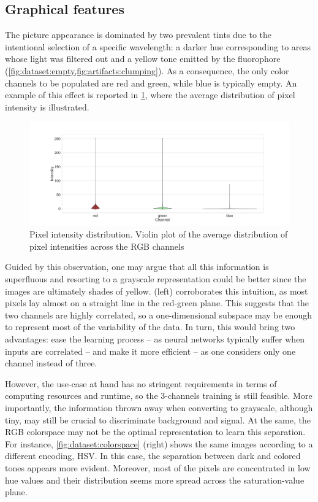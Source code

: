 \subsection{Graphical features}
The picture appearance is dominated by two prevalent tints due to the intentional selection of a specific wavelength: a darker hue corresponding to areas whose light was filtered out and a yellow tone emitted by the fluorophore
(\cref{fig:dataset:empty,fig:artifacts:clumping}).
As a consequence, the only color channels to be populated are red and green, while blue is typically empty. 
An example of this effect is reported in \cref{fig:dataset:pixel_intensity}, where the average distribution of pixel intensity is illustrated.
\begin{figure}
    \centering
    \includegraphics[width=\textwidth]{figures/120_dataset/pixel_intensity_distribution.png}
    \caption{Pixel intensity distribution. Violin plot of the average distribution of pixel intensities across the  RGB channels}
    \label{fig:dataset:pixel_intensity}
\end{figure}
Guided by this observation, one may argue that all this information is superfluous and resorting to a grayscale representation could be better since the images are ultimately shades of yellow.
 (left) corroborates this intuition, as most pixels lay almost on a straight line in the red-green plane. 
This suggests that the two channels are highly correlated, so a one-dimensional subspace may be enough to represent most of the variability of the data.
In turn, this would bring two advantages: ease the learning process -- as neural networks typically suffer when inputs are correlated %
-- and make it more efficient -- as one considers only one channel instead of three.

However, the use-case at hand has no stringent requirements in terms of computing resources and runtime, so the 3-channels training is still feasible.
More importantly, the information thrown away when converting to grayscale, although tiny, may still be crucial to discriminate background and signal. 
At the same, the RGB colorspace may not be the optimal representation to learn this separation. For instance, \cref{fig:dataset:colorspace} (right) shows the same images according to a different encoding, HSV. 
In this case, the separation between dark and colored tones appears more evident. 
Moreover, most of the pixels are concentrated in low hue values
and their distribution seems more spread across the saturation-value plane. 

